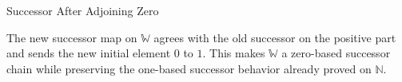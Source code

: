 
\label{sec:extending-successor}
\begin{topicbox}{Successor After Adjoining Zero}
\begin{exposition}
The new successor map on $\mathbb{W}$ agrees with the old successor on the
positive part and sends the new initial element $0$ to $1$. This makes
$\mathbb{W}$ a zero-based successor chain while preserving the one-based
successor behavior already proved on $\mathbb{N}$.
\end{exposition}
\end{topicbox}
